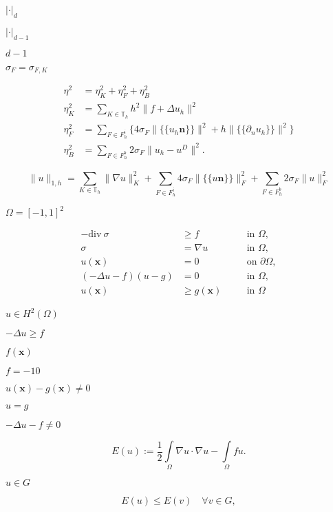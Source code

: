 \documentclass{article}
\begin{document}
$|\cdot|_d$
\pagebreak

$|\cdot|_{d-1}$
\pagebreak

$d-1$
\pagebreak

$\sigma_F = \sigma_{F,K}$
\pagebreak

\begin{align*} \eta^2 &= \eta_K^2 + \eta_F^2 + \eta_B^2 \\ \eta_K^2 &= \sum_{K\in \mathbb T_h} h^2 \|f + \Delta u_h\|^2 \\ \eta_F^2 &= \sum_{F \in F_h^i} \biggl\{ 4 \sigma_F \| \{\!\{u_h\mathbf n\}\!\} \|^2 + h \|\{\!\{\partial_n u_h\}\!\}\|^2 \biggr\} \\ \eta_B^2 &= \sum_{F \in F_h^b} 2\sigma_F \| u_h-u^D \|^2. \end{align*}
\pagebreak

\[ \|u\|_{1,h} = \sum_{K\in \mathbb T_h} \|\nabla u\|_K^2 + \sum_{F \in F_h^i} 4\sigma_F\|\{\!\{ u \mathbf n\}\!\}\|^2_F + \sum_{F \in F_h^b} 2\sigma_F\|u\|^2_F \]
\pagebreak

$\Omega = \left[-1,1\right]^2$
\pagebreak

\begin{align*} -\textrm{div}\ \sigma &\geq f & &\quad\text{in } \Omega,\\ \sigma &= \nabla u & &\quad\text{in } \Omega,\\ u(\mathbf x) &= 0 & &\quad\text{on }\partial\Omega,\\ (-\Delta u - f)(u - g) &= 0 & &\quad\text{in } \Omega,\\ u(\mathbf x) &\geq g(\mathbf x) & &\quad\text{in } \Omega \end{align*}
\pagebreak

$u\in H^2(\Omega)$
\pagebreak

$-\Delta u \ge f$
\pagebreak

$f(\mathbf x)$
\pagebreak

$f=-10$
\pagebreak

$u(\mathbf x) - g(\mathbf x) \neq 0$
\pagebreak

$u=g$
\pagebreak

$-\Delta u-f \neq 0$
\pagebreak

\begin{equation*} E(u):=\dfrac{1}{2}\int\limits_{\Omega} \nabla u \cdot \nabla u - \int\limits_{\Omega} fu. \end{equation*}
\pagebreak

$u\in G$
\pagebreak

\begin{equation*} E(u)\leq E(v)\quad \forall v\in G, \end{equation*}
\pagebreak
\end{document}
